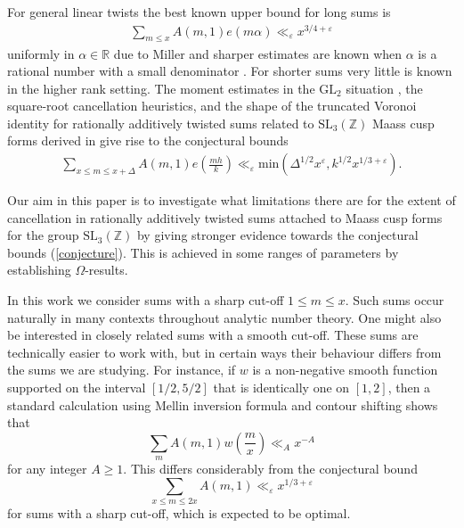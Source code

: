 \documentclass[a4paper,10pt,twoside]{amsart}
\theoremstyle{definition}
\numberwithin{equation}{section}
\newcommand\eps{\varepsilon}
\renewcommand\:{\colon}
\begin{document}
For general linear twists the best known upper bound for long sums is
\begin{align*}
\sum_{m\leq x}A(m,1)e(m\alpha)\ll_\varepsilon x^{3/4+\varepsilon}
\end{align*}
uniformly in $\alpha\in\mathbb R$ due to Miller \cite{Miller} and sharper estimates are known when $\alpha$ is a rational number with a small denominator \cite{Jaasaari--Vesalainen1}. For shorter sums very little is known in the higher rank setting. The moment estimates in the $\mathrm{GL}_2$ situation \cite{Jutila, Ernvall-Hytonen2011, Ernvall-Hytonen2015, Vesalainen}, the square-root cancellation heuristics, and the shape of the truncated Voronoi identity for rationally additively twisted sums related to $\mathrm{SL}_3(\mathbb Z)$ Maass cusp forms derived in \cite{Jaasaari--Vesalainen1} give rise to the conjectural bounds
\begin{align}\label{conjecture}
\sum_{x\leqslant m\leqslant x+\Delta}A(m,1)e\left(\frac{mh}k\right)\ll_\varepsilon\text{min}\left(\Delta^{1/2}x^{\varepsilon},k^{1/2}x^{1/3+\varepsilon}\right).
\end{align}  

\noindent Our aim in this paper is to investigate what limitations there are for the extent of cancellation in rationally additively twisted sums attached to Maass cusp forms for the group $\mathrm{SL}_3(\mathbb Z)$ by giving stronger evidence towards the conjectural bounds (\ref{conjecture}). This is achieved in some ranges of parameters by establishing $\Omega$-results.

In this work we consider sums with a sharp cut-off $1\leq m\leq x$. Such sums occur naturally in many contexts throughout analytic number theory. One might also be interested in closely related sums with a smooth cut-off. These sums are technically easier to work with, but in certain ways their behaviour differs from the sums we are studying. For instance, if $w$ is a non-negative smooth function supported on the interval $[1/2,5/2]$ that is identically one on $[1,2]$, then a standard calculation using Mellin inversion formula and contour shifting shows that
\[
\sum_m A(m,1)w\left(\frac mx\right)\ll_A x^{-A}
\]
for any integer $A\geq 1$. This differs considerably from the conjectural bound
\[ 
\sum_{x\leq m\leq 2x}A(m,1)\ll_\eps x^{1/3+\eps}\]
for sums with a sharp cut-off, which is expected to be optimal. 
\end{document}
